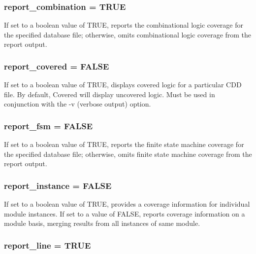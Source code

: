 \subsubsection{ {\bf report\_\-combination} = TRUE}\label{report_8c_a5}


If set to a boolean value of TRUE, reports the combinational logic coverage for the specified database file; otherwise, omits combinational logic coverage from the report output. 
\subsubsection{ {\bf report\_\-covered} = FALSE}\label{report_8c_a8}


If set to a boolean value of TRUE, displays covered logic for a particular CDD file. By default, Covered will display uncovered logic. Must be used in conjunction with the -v (verbose output) option. 
\subsubsection{ {\bf report\_\-fsm} = FALSE}\label{report_8c_a6}


If set to a boolean value of TRUE, reports the finite state machine coverage for the specified database file; otherwise, omits finite state machine coverage from the report output. 
\subsubsection{ {\bf report\_\-instance} = FALSE}\label{report_8c_a7}


If set to a boolean value of TRUE, provides a coverage information for individual module instances. If set to a value of FALSE, reports coverage information on a module basis, merging results from all instances of same module. 
\subsubsection{ {\bf report\_\-line} = TRUE}\label{report_8c_a3}



